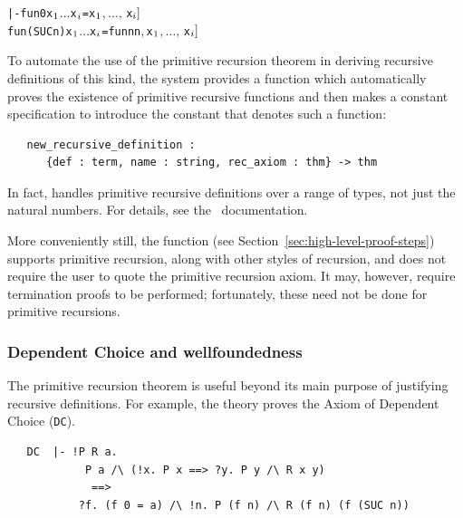 \begin{hol}
\begin{alltt}
   |- fun 0 x\(\sb{1}\) \(\dots\) x\(\sb{i}\) = \m{f\sb{1}[}x\(\sb{1}\)\(,\ldots,\,\)x\(\sb{i}]\)
      fun (SUC n) x\(\sb{1}\) \(\dots\) x\(\sb{i}\) = \m{f\sb{2}[}fun n  n\(,\) x\(\sb{1}\)\(,\ldots,\,\)x\(\sb{i}]\)
\end{alltt}
\end{hol}

To automate the use of the primitive recursion theorem in deriving
recursive definitions of this kind, the \HOL{} system provides a function
which automatically proves the existence of primitive recursive
functions and then makes a constant specification to introduce the constant
that denotes such a function:

\begin{boxed}
\begin{verbatim}
   new_recursive_definition :
      {def : term, name : string, rec_axiom : thm} -> thm
\end{verbatim}
\end{boxed}

\noindent In fact,  handles
primitive recursive definitions over a range of types, not just the
natural numbers. For details, see the \REFERENCE\ documentation.

More conveniently still, the  function (see
Section~\ref{sec:high-level-proof-steps}) supports primitive
recursion, along with other styles of recursion, and does not require
the user to quote the primitive recursion axiom. It may, however,
require termination proofs to be performed; fortunately, these need
not be done for primitive recursions.

\subsubsection{Dependent Choice and wellfoundedness}
\label{prim-rec-conseq}

The primitive recursion theorem is useful beyond its main purpose of
justifying recursive definitions. For example, the theory
 proves the Axiom of Dependent Choice ({\small\verb+DC+}).

\begin{hol}
\begin{verbatim}
   DC  |- !P R a.
            P a /\ (!x. P x ==> ?y. P y /\ R x y)
             ==>
           ?f. (f 0 = a) /\ !n. P (f n) /\ R (f n) (f (SUC n))
\end{verbatim}
\end{hol}

